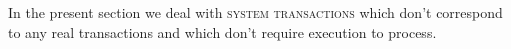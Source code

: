 In the present section we deal with \textsc{system transactions} which don't correspond to any real transactions and which don't require \evm{} execution to process.
